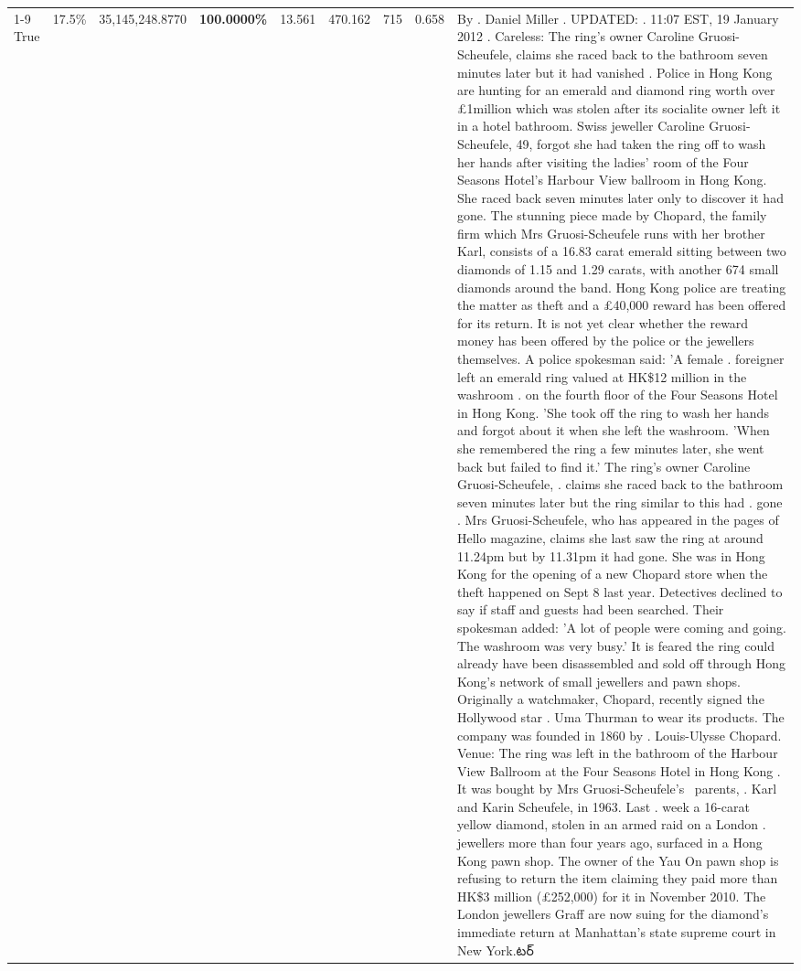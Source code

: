 \begin{table}[H]
\begin{tabular}{lllrlllll}
\cline{1-9}
True & 17.5\% & 35,145,248.8770 & \bfseries \color{red} 100.0000\% & 13.561 & 470.162 & 715 & 0.658 & By . Daniel Miller . UPDATED: . 11:07 EST, 19 January 2012 . Careless: The ring's owner Caroline Gruosi-Scheufele, claims she raced back to the bathroom seven minutes later but it had vanished . Police in Hong Kong are hunting for an emerald and diamond ring worth over £1million which was stolen after its socialite owner left it in a hotel bathroom. Swiss jeweller Caroline Gruosi-Scheufele, 49, forgot she had taken the ring off to wash her hands after visiting the ladies' room of the Four Seasons Hotel's Harbour View ballroom in Hong Kong. She raced back seven minutes later only to discover it had gone. The stunning piece made by Chopard, the family firm which Mrs Gruosi-Scheufele runs with her brother Karl, consists of a 16.83 carat emerald sitting between two diamonds of 1.15 and 1.29 carats, with another 674 small diamonds around the band. Hong Kong police are treating the matter as theft and a £40,000 reward has been offered for its return. It is not yet clear whether the reward money has been offered by the police or the jewellers themselves. A police spokesman said: 'A female . foreigner left an emerald ring valued at HK\$12 million in the washroom . on the fourth floor of the Four Seasons Hotel in Hong Kong. 'She took off the ring to wash her hands and forgot about it when she left the washroom. 'When she remembered the ring a few minutes later, she went back but failed to find it.' The ring's owner Caroline Gruosi-Scheufele, . claims she raced back to the bathroom seven minutes later but the ring similar to this had . gone . Mrs Gruosi-Scheufele, who has appeared in the pages of Hello magazine, claims she last saw the ring at around 11.24pm but by 11.31pm it had gone. She was in Hong Kong for the opening of a new Chopard store when the theft happened on Sept 8 last year. Detectives declined to say if staff and guests had been searched. Their spokesman added: 'A lot of people were coming and going. The washroom was very busy.' It is feared the ring could already have been disassembled and sold off through Hong Kong's network of small jewellers and pawn shops. Originally a watchmaker, Chopard, recently signed the Hollywood star . Uma Thurman to wear its products. The company was founded in 1860 by . Louis-Ulysse Chopard. Venue: The ring was left in the bathroom of the Harbour View Ballroom at the Four Seasons Hotel in Hong Kong . It was bought by Mrs Gruosi-Scheufele's  parents, . Karl and Karin Scheufele, in 1963. Last . week a 16-carat yellow diamond, stolen in an armed raid on a London . jewellers more than four years ago, surfaced in a Hong Kong pawn shop. The owner of the Yau On pawn shop is refusing to return the item claiming they paid more than HK\$3 million (£252,000) for it in November 2010. The London jewellers Graff are now suing for the diamond’s immediate return at Manhattan’s state supreme court in New York.టర్‌ \\

\end{tabular}
\end{table}
